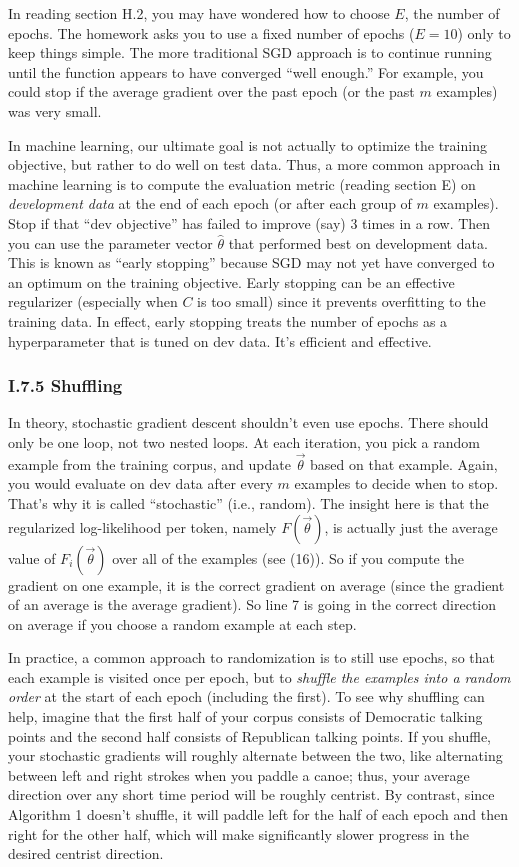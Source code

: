 In reading section H.2, you may have wondered how to choose $E$, the number of epochs. The homework asks you to use a fixed number of epochs ($E=10$) only to keep things simple. The more traditional SGD approach is to continue running until the function appears to have converged “well enough.” For example, you could stop if the average gradient over the past epoch (or the past $m$ examples) was very small.

In machine learning, our ultimate goal is not actually to optimize the training objective, but rather to do well on test data. Thus, a more common approach in machine learning is to compute the evaluation metric (reading section E) on \emph{development data} at the end of each epoch (or after each group of $m$ examples). Stop if that “dev objective” has failed to improve (say) 3 times in a row. Then you can use the parameter vector $\hat{\theta}$ that performed best on development data. This is known as “early stopping” because SGD may not yet have converged to an optimum on the training objective. Early stopping can be an effective regularizer (especially when $C$ is too small) since it prevents overfitting to the training data. In effect, early stopping treats the number of epochs as a hyperparameter that is tuned on dev data. It’s efficient and effective.

\subsubsection*{I.7.5 Shuffling}

In theory, stochastic gradient descent shouldn’t even use epochs. There should only be one loop, not two nested loops. At each iteration, you pick a random example from the training corpus, and update $\vec{\theta}$ based on that example. Again, you would evaluate on dev data after every $m$ examples to decide when to stop. That’s why it is called “stochastic” (i.e., random). The insight here is that the regularized log-likelihood per token, namely $F(\vec{\theta})$, is actually just the average value of $F_i(\vec{\theta})$ over all of the examples (see (16)). So if you compute the gradient on one example, it is the correct gradient on average (since the gradient of an average is the average gradient). So line 7 is going in the correct direction on average if you choose a random example at each step.

In practice, a common approach to randomization is to still use epochs, so that each example is visited once per epoch, but to \emph{shuffle the examples into a random order} at the start of each epoch (including the first). To see why shuffling can help, imagine that the first half of your corpus consists of Democratic talking points and the second half consists of Republican talking points. If you shuffle, your stochastic gradients will roughly alternate between the two, like alternating between left and right strokes when you paddle a canoe; thus, your average direction over any short time period will be roughly centrist. By contrast, since Algorithm 1 doesn’t shuffle, it will paddle left for the half of each epoch and then right for the other half, which will make significantly slower progress in the desired centrist direction.

